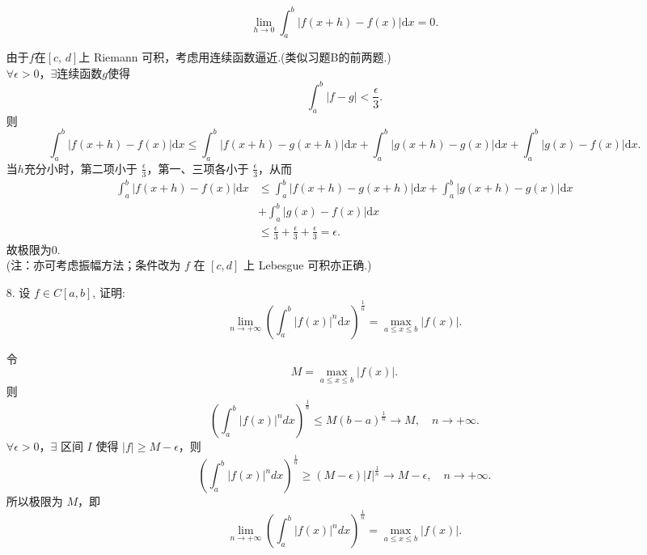 \begin{enumerate}
    \[\displaystyle\lim_{h\to 0}\int_{a}^{b}|f(x + h) - f(x)|\mathrm{d}x = 0.\]
    \begin{solution}
        由于$f$在$[c,\,d]$上 Riemann 可积，考虑用连续函数逼近.(类似习题B的前两题.)\\
        $\forall \epsilon > 0$，$\exists$连续函数$g$使得
        \[
        \int_a^b |f-g| < \frac{\epsilon}{3}.
        \]
        则
        \[
        \int_a^b |f(x+h)-f(x)| \mathrm{d}x \leq \int_a^b |f(x+h)-g(x+h)| \mathrm{d}x + \int_a^b |g(x+h)-g(x)| \mathrm{d}x + \int_a^b |g(x)-f(x)| \mathrm{d}x.
        \]
        当$h$充分小时，第二项小于 $\displaystyle \frac{\epsilon}{3} $，第一、三项各小于 $\displaystyle \frac{\epsilon}{3}$，从而
        \[
        \begin{aligned}
        \int_a^b |f(x+h)-f(x)| \mathrm{d}x &\leq \int_a^b |f(x+h)-g(x+h)| \mathrm{d}x + \int_a^b |g(x+h)-g(x)| \mathrm{d}x \\
        &+ \int_a^b |g(x)-f(x)| \mathrm{d}x\\
        &\leq \frac{\epsilon}{3}+\frac{\epsilon}{3}+\frac{\epsilon}{3}=\epsilon.
        \end{aligned}
        \]
        故极限为0. \\
        (注：亦可考虑振幅方法；条件改为 $f$ 在 $[c,d]$ 上 Lebesgue 可积亦正确.)
    \end{solution}
    
    \item[8.]设 \(\displaystyle f \in C[a,b]\), 证明:
    \[\displaystyle\lim_{n\to +\infty}\left(\int_{a}^{b}|f(x)|^{n}\mathrm{d}x\right)^{\frac{1}{n}} = \max_{a\leqslant x\leqslant b}|f(x)|.\]
    \begin{solution}
        令
        \[
        M = \max_{a \leq x \leq b} |f(x)|.
        \]
        则
        \[
        \left( \int_a^b |f(x)|^n dx \right)^{\frac{1}{n}} \leq M (b-a)^{\frac{1}{n}} \to M,\quad n\to +\infty.
        \]
        $\forall \epsilon > 0$，$\exists$ 区间 $I$ 使得 $|f| \geq M-\epsilon$，则
        \[
        \left( \int_a^b |f(x)|^n dx \right)^{\frac{1}{n}} \geq (M-\epsilon) |I|^{\frac{1}{n}} \to M-\epsilon,\quad n\to+\infty.
        \]
        所以极限为 $M$，即
        \[
        \lim_{n \to +\infty} \left( \int_a^b |f(x)|^n dx \right)^{\frac{1}{n}} = \max_{a \leq x \leq b} |f(x)|. 
        \]
    \end{solution}
\end{enumerate}